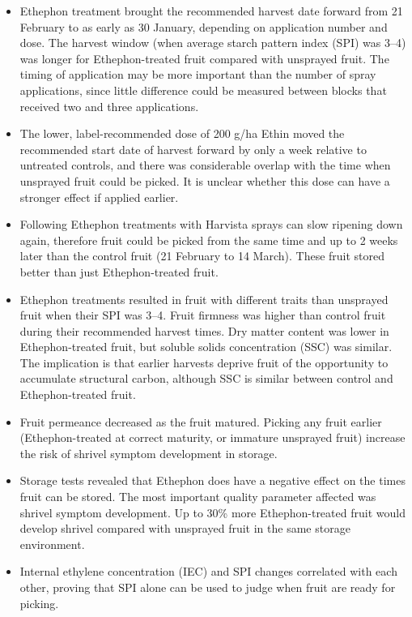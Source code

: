 \documentclass[
  letterpaper,
  DIV=11,
  numbers=noendperiod]{scrartcl}
\providecommand{\tightlist}{%
  \setlength{\itemsep}{0pt}\setlength{\parskip}{0pt}}\usepackage{longtable,booktabs,array}
\begin{document}
\begin{itemize}
\tightlist
\item
  Ethephon treatment brought the recommended harvest date forward from
  21 February to as early as 30 January, depending on application number
  and dose. The harvest window (when average starch pattern index (SPI)
  was 3--4) was longer for Ethephon-treated fruit compared with
  unsprayed fruit. The timing of application may be more important than
  the number of spray applications, since little difference could be
  measured between blocks that received two and three applications.
\item
  The lower, label-recommended dose of 200 g/ha Ethin moved the
  recommended start date of harvest forward by only a week relative to
  untreated controls, and there was considerable overlap with the time
  when unsprayed fruit could be picked. It is unclear whether this dose
  can have a stronger effect if applied earlier.
\item
  Following Ethephon treatments with Harvista sprays can slow ripening
  down again, therefore fruit could be picked from the same time and up
  to 2 weeks later than the control fruit (21 February to 14 March).
  These fruit stored better than just Ethephon-treated fruit.
\item
  Ethephon treatments resulted in fruit with different traits than
  unsprayed fruit when their SPI was 3--4. Fruit firmness was higher
  than control fruit during their recommended harvest times. Dry matter
  content was lower in Ethephon-treated fruit, but soluble solids
  concentration (SSC) was similar. The implication is that earlier
  harvests deprive fruit of the opportunity to accumulate structural
  carbon, although SSC is similar between control and Ethephon-treated
  fruit.
\item
  Fruit permeance decreased as the fruit matured. Picking any fruit
  earlier (Ethephon-treated at correct maturity, or immature unsprayed
  fruit) increase the risk of shrivel symptom development in storage.
\item
  Storage tests revealed that Ethephon does have a negative effect on
  the times fruit can be stored. The most important quality parameter
  affected was shrivel symptom development. Up to 30\% more
  Ethephon-treated fruit would develop shrivel compared with unsprayed
  fruit in the same storage environment.
\item
  Internal ethylene concentration (IEC) and SPI changes correlated with
  each other, proving that SPI alone can be used to judge when fruit are
  ready for picking.
\end{itemize}
\end{document}
